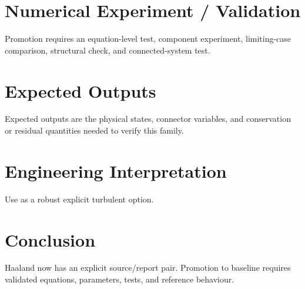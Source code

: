 \documentclass[10pt,a4paper]{article}
\begin{document}
\section{Numerical Experiment / Validation}Promotion requires an equation-level test, component experiment, limiting-case comparison, structural check, and connected-system test.
\section{Expected Outputs}Expected outputs are the physical states, connector variables, and conservation or residual quantities needed to verify this family.
\section{Engineering Interpretation}Use as a robust explicit turbulent option.
\section*{Conclusion}Haaland now has an explicit source/report pair. Promotion to baseline requires validated equations, parameters, tests, and reference behaviour.
\end{document}
